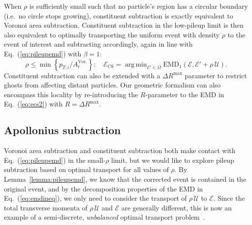 \documentclass[letterpaper,11pt]{article}
\DeclareMathOperator*{\argmin}{arg\,min}
\newcommand{\E}{\mathcal{E}}
\DeclareRobustCommand{\Eq}[1]{Eq.~(\ref{#1})}
\newcommand{\EMD}{\text{EMD}\xspace}
\begin{document}
When $\rho$ is sufficiently small such that no particle's region has a circular boundary (i.e.\ no circle stops growing), constituent subtraction is exactly equivalent to Voronoi area subtraction.
%
Constituent subtraction in the low-pileup limit is then also equivalent to optimally transporting the uniform event with density $\rho$ to the event of interest and subtracting accordingly, again in line with \Eq{eq:pileupemd} with $\beta=1$:
%
\begin{equation}\label{eq:ecs2}
\boxed{
\rho \le \min\left\{p_{T,i}/A_i^\text{Vor.}\right\}: \quad \mathcal E_\text{CS} = \argmin_{\mathcal E' \in \Omega} \EMD_1(\mathcal E, \mathcal E' + \rho\,\mathcal U).
}
\end{equation}
%
Constituent subtraction can also be extended with a $\Delta R^\text{max}$ parameter to restrict ghosts from affecting distant particles.
%
Our geometric formalism can also encompass this locality by re-introducing the $R$-parameter to the EMD in \Eq{eq:ecs2} with $R = \Delta R^\text{max}$.


\subsection{Apollonius subtraction}
\label{sec:apollonius}


Voronoi area subtraction and constituent subtraction both make contact with \Eq{eq:pileupemd} in the small-$\rho$ limit, but we would like to explore pileup subtraction based on optimal transport for all values of $\rho$.
%
By Lemma~\ref{lemma:pileupemd}, we know that the corrected event is contained in the original event, and by the decomposition properties of the EMD in \Eq{eq:emdineq}, we only need to consider the transport of $\rho\,\mathcal U$ to $\E$.
%
Since the total transverse momenta of $\rho\,\mathcal U$ and $\E$ are generally different, this is now an example of a semi-discrete, \emph{unbalanced} optimal transport problem~\cite{OTtheory,bourne2018semi}.
\end{document}
